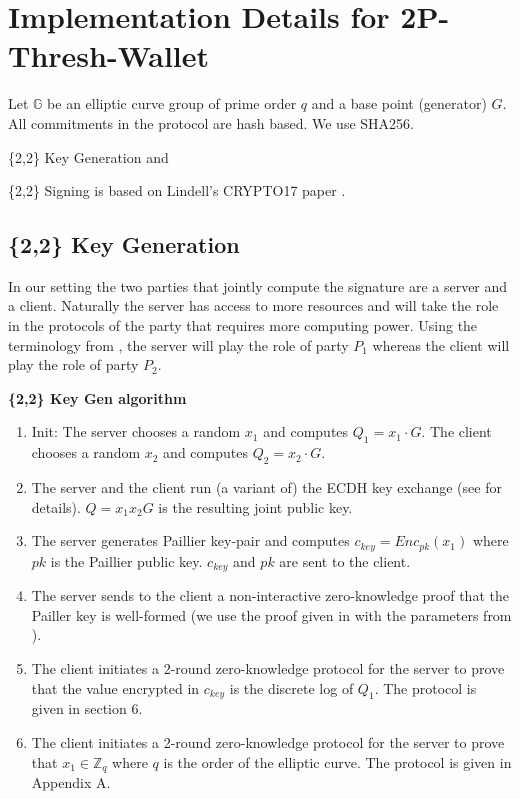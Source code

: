 \documentclass[runningheads]{llncs}
\begin{document}
\section{Implementation Details for 2P-Thresh-Wallet}
Let $\mathbb{G}$ be an elliptic curve group of prime order $q$ and a base point (generator) $G$. All commitments in the protocol are hash based. We use SHA256. {\{2,2\} Key Generation and {\{2,2\} Signing is based on Lindell's CRYPTO17 paper \cite{lindell17}.


\subsection{\{2,2\} Key Generation}
In our setting the two parties that jointly compute the signature are a server and a client. Naturally the server has access to more resources and will take the role in the protocols of the party that requires more computing power. Using the terminology from  \cite{lindell17}, the server will play the role of party ${P_1}$ whereas the client will play the role of party ${P_2}$.

\begin{mdframed}[userdefinedwidth = 12.3cm]
\textbf{\{2,2\} Key Gen algorithm}
\begin{enumerate}
\item Init: The server chooses a random ${x_1}$ and computes ${Q_1 = x_1 \cdot G}$. The client chooses a random ${x_2}$  and computes ${Q_2 = x_2 \cdot G}$.
\item The server and the client run (a variant of)  the ECDH key exchange (see \cite{lindell17} for details). $Q=x_1x_2G$ is the resulting joint public key. 
\item The server generates Paillier \cite{paillier} key-pair and computes ${c_{key} =Enc_{pk}(x_1)}$ where ${pk}$ is the Paillier public key. ${c_{key}}$ and ${pk}$ are sent to the client.
\item The server sends to the client a non-interactive zero-knowledge proof that the Pailler key is well-formed (we use the proof given in \cite{sharon} with the parameters from \cite{lindell18}).
\item The client initiates a 2-round zero-knowledge protocol for the server to prove that the value encrypted in ${c_{key}}$ is the discrete log of ${Q_1}$. The protocol is given in \cite{lindell17} section 6.
\item The client initiates a 2-round zero-knowledge protocol for the server to prove that ${x_1 \in \mathbb{Z}_q}$ where ${q}$ is the order of the elliptic curve. The protocol is given in \cite{lindell17} Appendix A.
\end{enumerate}


\end{mdframed}}}
\end{document}
